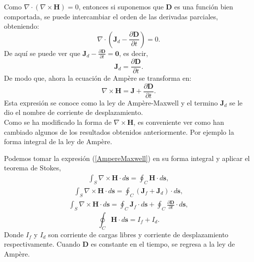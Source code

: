 \documentclass[11pt,fleqn]{book} %
\begin{document}
Como $\nabla \cdot(\nabla \times \textbf{H})=0$, entonces si suponemos que $\textbf{D}$ es una funci\'on bien comportada, se puede intercambiar el orden de las derivadas parciales, obteniendo:
\begin{equation}
\nabla \cdot \left( \textbf{J}_{d}-\frac{\partial \textbf{D}}{\partial t} \right)=0.
\end{equation}
De aqu\'i se puede ver que $\textbf{J}_{d}-\frac{\partial \textbf{D}}{\partial t}=\textbf{0}$, es decir,
\begin{equation}
\textbf{J}_{d}=\frac{\partial \textbf{D}}{\partial t}.
\end{equation}
De modo que, ahora la ecuaci\'on de Ampère se transforma en:
\begin{equation}
\nabla \times \textbf{H}= \textbf{J}+\frac{\partial \textbf{D}}{\partial t}. \label{AmpereMaxwell}
\end{equation}
Esta expresi\'on se conoce como la ley de Amp\`ere-Maxwell y el termino $\textbf{J}_{d}$ se le dio el nombre de corriente de desplazamiento.\cite{Milford1986} \\
Como se ha modificado la forma de $\nabla \times \textbf{H}$, es conveniente ver como han cambiado algunos de los resultados obtenidos anteriormente. Por ejemplo la forma integral de la ley de Ampère.


\begin{obs}
Podemos tomar la expresi\'on (\ref{AmpereMaxwell}) en su forma integral y aplicar el teorema de Stokes,
\begin{eqnarray*}
\int_{S} \nabla \times \textbf{H} \cdot d\textbf{s}=\oint_{C} \textbf{H}\cdot d\textbf{s},
\end{eqnarray*}
\begin{eqnarray*}
\int_{S} \nabla \times \textbf{H} \cdot d\textbf{s}=\oint_{C} (\textbf{J}_{f}+\textbf{J}_{d})\cdot d\textbf{s},
\end{eqnarray*}
\begin{eqnarray*}
\int_{S} \nabla \times \textbf{H} \cdot d\textbf{s}=\oint_{C} \textbf{J}_{f}\cdot d\textbf{s}+\oint_{C}\frac{\partial \textbf{D}}{\partial t}\cdot d\textbf{s},
\end{eqnarray*}
\begin{equation}
\oint_{C} \textbf{H}\cdot d\textbf{s}=I_{f}+I_{d}.  \label{SumdecorrientesAmpere}
\end{equation}
Donde $I_{f}$ y $I_{d}$ son corriente de cargas libres y corriente de desplazamiento respectivamente. Cuando $\textbf{D}$ es constante en el tiempo, se regresa a la ley de Ampère.\\\\
\end{obs}
\end{document}
